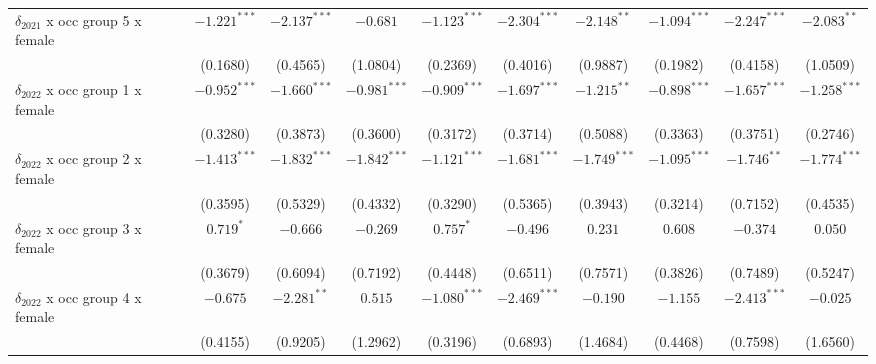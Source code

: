 \begin{tabular}{l|ccc|ccc|ccc}
$\delta_{2021}$ x occ group 5 x female &          $-1.221^{***}$ &  $-2.137^{***}$ &        $-0.681$ &           $-1.123^{***}$ &  $-2.304^{***}$ &   $-2.148^{**}$ &           $-1.094^{***}$ &  $-2.247^{***}$ &   $-2.083^{**}$ \\
                                       &                (0.1680) &        (0.4565) &        (1.0804) &                 (0.2369) &        (0.4016) &        (0.9887) &                 (0.1982) &        (0.4158) &        (1.0509) \\
$\delta_{2022}$ x occ group 1 x female &          $-0.952^{***}$ &  $-1.660^{***}$ &  $-0.981^{***}$ &           $-0.909^{***}$ &  $-1.697^{***}$ &   $-1.215^{**}$ &           $-0.898^{***}$ &  $-1.657^{***}$ &  $-1.258^{***}$ \\
                                       &                (0.3280) &        (0.3873) &        (0.3600) &                 (0.3172) &        (0.3714) &        (0.5088) &                 (0.3363) &        (0.3751) &        (0.2746) \\
$\delta_{2022}$ x occ group 2 x female &          $-1.413^{***}$ &  $-1.832^{***}$ &  $-1.842^{***}$ &           $-1.121^{***}$ &  $-1.681^{***}$ &  $-1.749^{***}$ &           $-1.095^{***}$ &   $-1.746^{**}$ &  $-1.774^{***}$ \\
                                       &                (0.3595) &        (0.5329) &        (0.4332) &                 (0.3290) &        (0.5365) &        (0.3943) &                 (0.3214) &        (0.7152) &        (0.4535) \\
$\delta_{2022}$ x occ group 3 x female &               $0.719^*$ &        $-0.666$ &        $-0.269$ &                $0.757^*$ &        $-0.496$ &         $0.231$ &                  $0.608$ &        $-0.374$ &         $0.050$ \\
                                       &                (0.3679) &        (0.6094) &        (0.7192) &                 (0.4448) &        (0.6511) &        (0.7571) &                 (0.3826) &        (0.7489) &        (0.5247) \\
$\delta_{2022}$ x occ group 4 x female &                $-0.675$ &   $-2.281^{**}$ &         $0.515$ &           $-1.080^{***}$ &  $-2.469^{***}$ &        $-0.190$ &                 $-1.155$ &  $-2.413^{***}$ &        $-0.025$ \\
                                       &                (0.4155) &        (0.9205) &        (1.2962) &                 (0.3196) &        (0.6893) &        (1.4684) &                 (0.4468) &        (0.7598) &        (1.6560) \\

\end{tabular}
